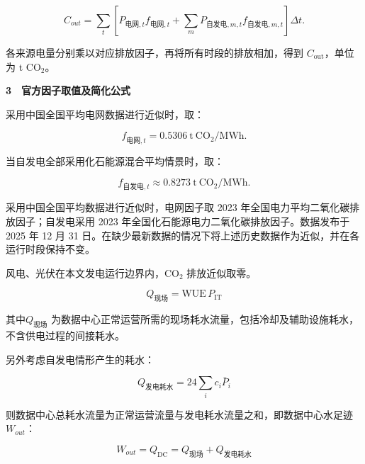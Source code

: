 \begin{equation}\label{eq:q2-carbon}
C_{out}{\mathrm{}}
=\sum_t\left[
P_{\text{电网},t}f_{\text{电网},t}
+\sum_mP_{\text{自发电},m,t}f_{\text{自发电},m,t}
\right]\Delta t.
\end{equation}

各来源电量分别乘以对应排放因子，再将所有时段的排放相加，得到 $C_{\mathrm{out}}$，单位为 t CO$_2$。

\textbf{3　官方因子取值及简化公式}

采用中国全国平均电网数据进行近似时，取：

\begin{equation}\label{eq:q2-fgrid}
f_{\text{电网},t}=0.5306\ \mathrm{t\ CO_2/MWh}.
\end{equation}

当自发电全部采用化石能源混合平均情景时，取：

\begin{equation}\label{eq:q2-fself}
f_{\text{自发电},t}\approx0.8273\ \mathrm{t\ CO_2/MWh}.
\end{equation}

采用中国全国平均数据进行近似时，电网因子取 2023 年全国电力平均二氧化碳排放因子；自发电采用 2023 年全国化石能源电力二氧化碳排放因子。数据发布于 2025 年 12 月 31 日\cite{q2bref01,q2bref02}。在缺少最新数据的情况下将上述历史数据作为近似，并在各运行时段保持不变。

风电、光伏在本文发电运行边界内，CO$_2$ 排放近似取零。


\begin{equation}\label{eq:q2-qfield}
Q_{\text{现场}} =\mathrm{WUE}\,P_{\mathrm{IT}}
\end{equation}

其中$Q_{\text{现场}}$ 为数据中心正常运营所需的现场耗水流量，包括冷却及辅助设施耗水，不含供电过程的间接耗水。

另外考虑自发电情形产生的耗水：

\begin{equation}\label{eq:q2-qgen}
Q_{\text{发电耗水}}=24\sum_i c_i\bar P_i
\end{equation}

则数据中心总耗水流量为正常运营流量与发电耗水流量之和，即数据中心水足迹$W_{out}$：

\begin{equation}\label{eq:q2-wout}
W_{out}=Q_{\mathrm{DC}}=Q_{\text{现场}}+Q_{\text{发电耗水}}
\end{equation}

